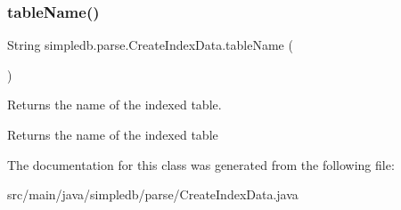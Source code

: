 \subsubsection{\texorpdfstring{table\+Name()}{tableName()}}
{\footnotesize\ttfamily String simpledb.\+parse.\+Create\+Index\+Data.\+table\+Name (\begin{DoxyParamCaption}{ }\end{DoxyParamCaption})\hspace{0.3cm}{\ttfamily [inline]}}

Returns the name of the indexed table. \begin{DoxyReturn}{Returns}
the name of the indexed table 
\end{DoxyReturn}


The documentation for this class was generated from the following file\+:\begin{DoxyCompactItemize}
\item 
src/main/java/simpledb/parse/Create\+Index\+Data.\+java\end{DoxyCompactItemize}
